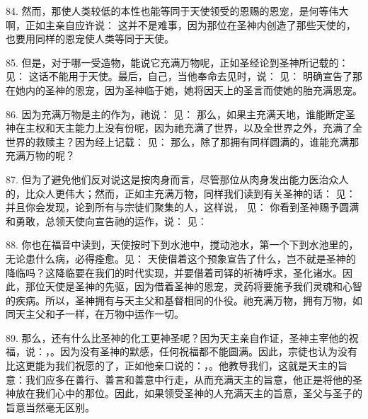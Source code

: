 84. 然而，那使人类较低的本性也能等同于天使领受的恩赐的恩宠，是何等伟大啊，正如主亲自应许说： 这并不是难事，因为那位在圣神内创造了那些天使的，也要用同样的恩宠使人类等同于天使。\par

85. 但是，对于哪一受造物，能说它充满万物呢，正如圣经论到圣神所记载的： 见： 这话不能用于天使。最后，自己，当他奉命去见时，说： 见： 明确宣告了那在她内的圣神的恩宠，因为圣神临于她，她将因天上的圣言而使她的胎充满恩宠。\par

86. 因为充满万物是主的作为，祂说： 见： 那么，如果主充满天地，谁能断定圣神在主权和天主能力上没有份呢，因为祂充满了世界，以及全世界之外，充满了全世界的救赎主？因为经上记载： 见： 那么，除了那拥有同样圆满的，谁能充满那充满万物的呢？\par

87. 但为了避免他们反对说这是按肉身而言，尽管那位从肉身发出能力医治众人的，比众人更伟大；然而，正如主充满万物，同样我们读到有关圣神的话： 见： 并且你会发现，论到所有与宗徒们聚集的人，这样说， 见： 你看到圣神赐予圆满和勇敢，总领天使向宣告祂的运作，说： 见：\par

88. 你也在福音中读到，天使按时下到水池中，搅动池水，第一个下到水池里的，无论患什么病，必得痊愈。见： 天使借着这个预象宣告了什么，岂不就是圣神的降临吗？这降临要在我们的时代实现，并要借着司铎的祈祷呼求，圣化诸水。因此，那位天使是圣神的先驱，因为借着圣神的恩宠，灵药将要施予我们灵魂和心智的疾病。所以，圣神拥有与天主父和基督相同的仆役。祂充满万物，拥有万物，如同天主父和子一样，在万物中运作一切。\par

89. 那么，还有什么比圣神的化工更神圣呢？因为天主亲自作证，圣神主宰他的祝福，说：，。因为没有圣神的默感，任何祝福都不能圆满。因此，宗徒也认为没有比这更能为我们祝愿的了，正如他亲口说的：，。他教导我们，这就是天主的旨意：我们应多在善行、善言和善意中行走，从而充满天主的旨意，他正是将他的圣神放在我们心中的那位。因此，如果领受圣神的人充满天主的旨意，圣父与圣子的旨意当然毫无区别。\par

